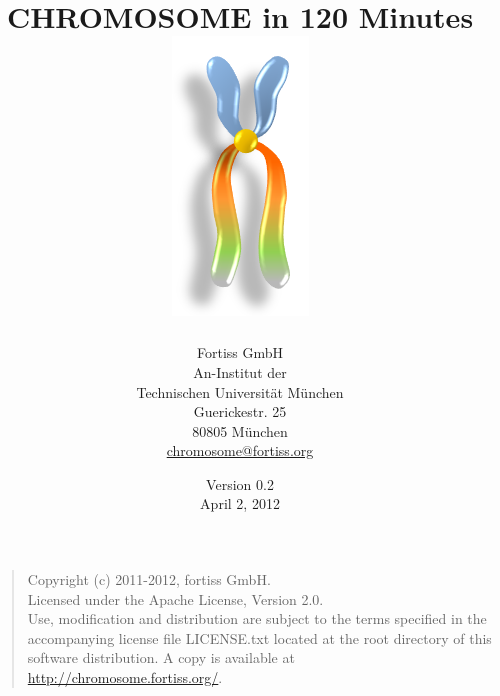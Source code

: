 \documentclass[11pt,twoside,a4paper]{article}
\title{\textsf{CHROMOSOME in 120 Minutes} \\ \includegraphics{figures/PNG/title.png}}
\author{%
	Fortiss GmbH\\[6pt]
	An-Institut der\\
	Technischen Universit\"at M\"unchen\\[6pt]
	Guerickestr. 25\\
	80805 M\"unchen\\[6pt]
	\url{chromosome@fortiss.org}
}
\date{Version 0.2\\April 2, 2012}
\begin{document}
\maketitle

\vfill
\begin{quote}
Copyright (c) 2011-2012, fortiss GmbH.\\
Licensed under the Apache License, Version 2.0.\\[6pt]

Use, modification and distribution are subject to the terms specified
in the accompanying license file LICENSE.txt located at the root directory
of this software distribution. A copy is available at
\url{http://chromosome.fortiss.org/}.
\end{quote}

\newpage
\tableofcontents
\newpage


\clearpage

\clearpage

\clearpage

\clearpage

\clearpage



\clearpage
\appendix


\clearpage

\clearpage

\clearpage

\end{document}
